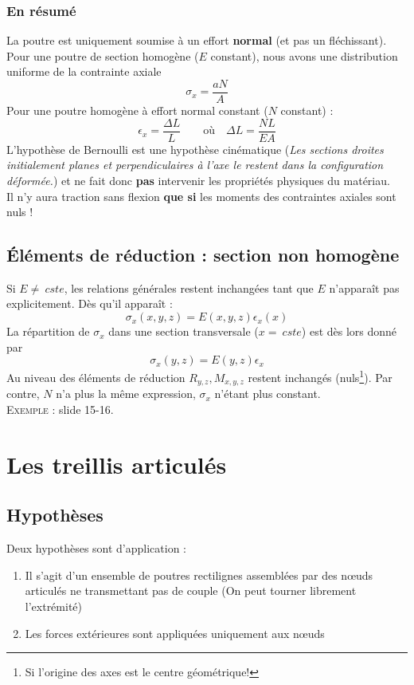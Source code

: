 		\subsubsection{En résumé}
		La poutre est uniquement soumise à un effort \textbf{normal} (et pas 
		un fléchissant). Pour une poutre de section homogène ($E$ constant), 
		nous avons une distribution uniforme de la contrainte axiale 
		\begin{equation}
		\sigma_x = \dfrac{aN}{A}
		\end{equation}
		Pour une poutre homogène à effort normal constant ($N$ constant) :
		\begin{equation}
		\epsilon_x = \dfrac{\Delta L}{L}\qquad\text{où}\quad \Delta L = 
		\dfrac{NL}{EA}
		\end{equation}
		L'hypothèse de Bernoulli est une hypothèse cinématique (\textit{Les 
		sections droites initialement planes et perpendiculaires à l'axe le
		restent dans la configuration déformée.}) et ne fait donc \textbf{pas} 
		intervenir les propriétés physiques du matériau.\\
		\danger Il n'y aura traction sans flexion \textbf{que si} les moments 
		des contraintes axiales sont nuls !
		
		
	\subsection{Éléments de réduction : section non homogène}		
	Si $E \neq\ cste$, les relations générales restent inchangées tant que 
	$E$ n'apparaît pas explicitement. Dès qu'il apparaît :
	\begin{equation}
	\sigma_x(x,y,z) = E(x,y,z)\epsilon_x(x)
	\end{equation}
	La répartition de $\sigma_x$ dans une section transversale ($x =\ cste$) 
	est dès lors donné par 
	\begin{equation}
	\sigma_x(y,z) = E(y,z)\epsilon_x
	\end{equation}
	Au niveau des éléments de réduction $R_{y,z}, M_{x,y,z}$ restent inchangés 
	(nuls\footnote{Si l'origine des axes est le centre géométrique!}). Par contre, 
	$N$ n'a plus la même expression, $\sigma_x$ n'étant plus constant.\\
	\textsc{Exemple} : slide 15-16.
	
\section{Les treillis articulés}
	\subsection{Hypothèses}
	Deux hypothèses sont d'application :
	\begin{enumerate}
	\item Il s'agit d'un ensemble de poutres rectilignes assemblées par des 
	nœuds articulés ne transmettant pas de couple (On peut tourner librement 
	l’extrémité)
	\item Les forces extérieures sont appliquées uniquement aux nœuds
	\end{enumerate}
	
